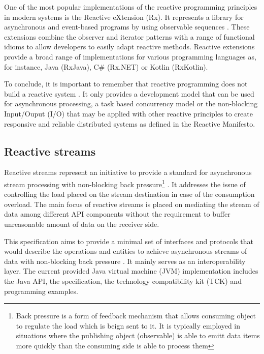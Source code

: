 \documentclass[oneside,
  digital, %
  table,   %
  lof,     %
  lot,     %
]{fithesis3}
\begin{document}
One of the most popular implementations of the reactive programming principles in modern systems is the Reactive eXtension (Rx). It represents a library for asynchronous and event-based programs by using observable sequences \cite{rxJava}. These extensions combine the observer and iterator patterns with a range of functional idioms to allow developers to easily adapt reactive methods. Reactive extensions provide a broad range of implementations for various programming languages as, for instance, Java (RxJava), C\# (Rx.NET) or Kotlin (RxKotlin). 

To conclude, it is important to remember that reactive programming does not build a reactive system \cite{5thingsAboutRP_RHDev}. It only provides a development model that can be used for asynchronous processing, a task based concurrency model or the non-blocking Input/Ouput (I/O) that may be applied with other reactive principles to create responsive and reliable distributed systems as defined in the Reactive Manifesto.

\subsection{Reactive streams}

Reactive streams represent an initiative to provide a standard for asynchronous stream processing with non-blocking back pressure\footnote{Back pressure is a form of feedback mechanism that allows consuming object to regulate the load which is beign sent to it. It is typically employed in situations where the publishing object (observable) is able to emitt data items more quickly than the consuming side is able to process them} \cite{reactive_streams}. It addresses the issue of controlling the load placed on the stream destination in case of the consumption overload. The main focus of reactive streams is placed on mediating the stream of data among different API components without the requirement to buffer unreasonable amount of data on the receiver side. 

This specification aims to provide a minimal set of interfaces and protocols that would describe the operations and entities to achieve asynchronous streams of data with non-blocking back pressure \cite{building_reactive_ms_in_java}. It mainly serves as an interoperability layer. The current provided Java virtual machine (JVM) implementation includes the Java API, the specification, the technology compatibility kit (TCK) and programming examples. 
\end{document}

